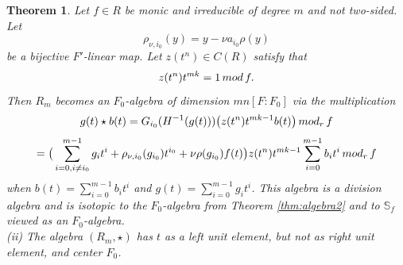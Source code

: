 \documentclass[10pt,a4paper]{amsart}
\newtheorem{theorem}{Theorem}
\begin{document}
\begin{theorem} \label{thm:algebra3}
Let $f\in R$ be monic and irreducible of degree $m$ and not two-sided. Let
$$\rho_{\nu,i_0}(y)=y-\nu a_{i_0}\rho(y)$$
 be a bijective $F'$-linear map.
 Let $z(t^n)\in C(R)$ satisfy that
 $$z(t^n)t^{mk}=1\,{\rm mod}\,f.$$
 Then $R_m$ becomes an $F_0$-algebra  of dimension $mn[F:F_0]$  via the multiplication
$$g(t) \star b(t)=G_{i_0}(H^{-1}(g(t))) \big( z(t^n)t^{mk-1} b(t)\big) \, {\rm mod}_r\, f$$
$$=\big(\sum_{i=0,i\not=i_0}^{m-1} g_it^i +\rho_{\nu,i_0}(g_{i_0})t^{i_0} + \nu\rho(g_{i_0})f(t)\big) z(t^n)t^{mk-1} \sum_{i=0}^{m-1} b_it^i \, {\rm mod}_r\,f$$
when $b(t)=\sum_{i=0}^{m-1} b_it^i$ and $g(t)=\sum_{i=0}^{m-1} g_it^i$.
This algebra is a division algebra and is isotopic to the $F_0$-algebra from Theorem  \ref{thm:algebra2} and to $\mathbb{S}_f$ viewed as an $F_0$-algebra.
\\ (ii) The algebra $(R_m,\star)$  has $t$ as a left unit element, but not as right unit element, and center $F_0$.
\end{theorem}
\end{document}
